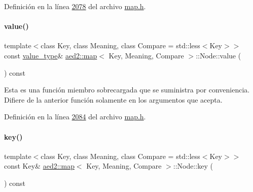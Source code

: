 Definición en la línea \hyperlink{map_8h_source_l02078}{2078} del archivo \hyperlink{map_8h_source}{map.\+h}.

\mbox{\label{structaed2_1_1map_1_1Node_ab66a33cedd0ba5cc20e366d4769184ae_ab66a33cedd0ba5cc20e366d4769184ae}} 
\paragraph{\texorpdfstring{value()}{value()}\hspace{0.1cm}{\footnotesize\ttfamily [2/2]}}
{\footnotesize\ttfamily template$<$class Key, class Meaning, class Compare = std\+::less$<$\+Key$>$$>$ \\
const \hyperlink{classaed2_1_1map_a719db98e0ff9a837610f76be33264680_a719db98e0ff9a837610f76be33264680}{value\+\_\+type}\& \hyperlink{classaed2_1_1map}{aed2\+::map}$<$ Key, Meaning, Compare $>$\+::Node\+::value (\begin{DoxyParamCaption}{ }\end{DoxyParamCaption}) const\hspace{0.3cm}{\ttfamily [inline]}}

Esta es una función miembro sobrecargada que se suministra por conveniencia. Difiere de la anterior función solamente en los argumentos que acepta. 

Definición en la línea \hyperlink{map_8h_source_l02084}{2084} del archivo \hyperlink{map_8h_source}{map.\+h}.

\mbox{\label{structaed2_1_1map_1_1Node_a08fd071b9bba8048526b8da7e8d73831_a08fd071b9bba8048526b8da7e8d73831}} 
\paragraph{\texorpdfstring{key()}{key()}}
{\footnotesize\ttfamily template$<$class Key, class Meaning, class Compare = std\+::less$<$\+Key$>$$>$ \\
const Key\& \hyperlink{classaed2_1_1map}{aed2\+::map}$<$ Key, Meaning, Compare $>$\+::Node\+::key (\begin{DoxyParamCaption}{ }\end{DoxyParamCaption}) const\hspace{0.3cm}{\ttfamily [inline]}}




